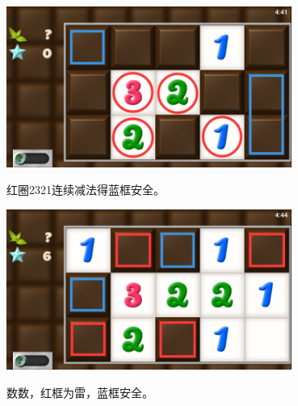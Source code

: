 \subsection{} %
\begin{center}
    \includegraphics[width=0.7\textwidth]{puzzle/71-1.png}
\end{center}
红圈2321连续减法得蓝框安全。
\begin{center}
    \includegraphics[width=0.7\textwidth]{puzzle/71-2.png}
\end{center}
数数，红框为雷，蓝框安全。

